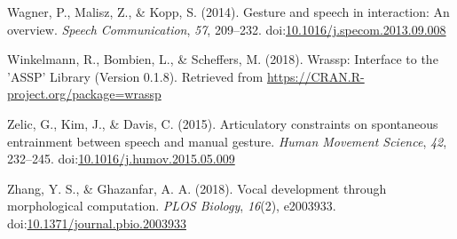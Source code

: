 \documentclass[
  man,floatsintext]{apa6}
\newlength{\cslhangindent}
\newenvironment{cslreferences}%
  {\setlength{\parindent}{0pt}%
  \everypar{\setlength{\hangindent}{\cslhangindent}}\ignorespaces}%
  {\par}
\begin{document}
\begin{cslreferences}
\leavevmode\hypertarget{ref-wagnerGestureSpeechInteraction2014}{}%
Wagner, P., Malisz, Z., \& Kopp, S. (2014). Gesture and speech in interaction: An overview. \emph{Speech Communication}, \emph{57}, 209--232. doi:\href{https://doi.org/10.1016/j.specom.2013.09.008}{10.1016/j.specom.2013.09.008}

\leavevmode\hypertarget{ref-winkelmannWrasspInterfaceASSP2018}{}%
Winkelmann, R., Bombien, L., \& Scheffers, M. (2018). Wrassp: Interface to the 'ASSP' Library (Version 0.1.8). Retrieved from \url{https://CRAN.R-project.org/package=wrassp}

\leavevmode\hypertarget{ref-zelicArticulatoryConstraintsSpontaneous2015}{}%
Zelic, G., Kim, J., \& Davis, C. (2015). Articulatory constraints on spontaneous entrainment between speech and manual gesture. \emph{Human Movement Science}, \emph{42}, 232--245. doi:\href{https://doi.org/10.1016/j.humov.2015.05.009}{10.1016/j.humov.2015.05.009}

\leavevmode\hypertarget{ref-zhangVocalDevelopmentMorphological2018}{}%
Zhang, Y. S., \& Ghazanfar, A. A. (2018). Vocal development through morphological computation. \emph{PLOS Biology}, \emph{16}(2), e2003933. doi:\href{https://doi.org/10.1371/journal.pbio.2003933}{10.1371/journal.pbio.2003933}
\end{cslreferences}

\endgroup
\end{document}
